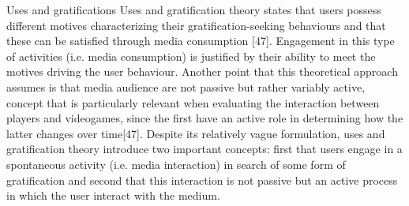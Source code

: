 Uses and gratifications
Uses and gratification theory states that users possess different motives characterizing their gratification-seeking behaviours and that these can be satisfied through media consumption [47]. Engagement in this type of activities (i.e. media consumption) is justified by their ability to meet the motives driving the user behaviour. Another point that this theoretical approach assumes is that media audience are not passive but rather variably active, concept that is particularly relevant when evaluating the interaction between players and videogames, since the first have an active role in determining how the latter changes over time[47]. Despite its relatively vague formulation, uses and gratification theory introduce two important concepts: first that users engage in a spontaneous activity (i.e. media interaction) in search of some form of gratification and second that this interaction is not passive but an active process in which the user interact with the medium.


